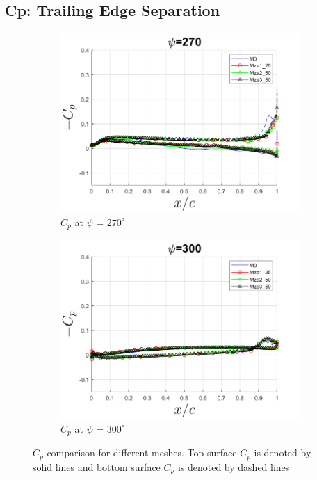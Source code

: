 \subsection{Cp: Trailing Edge Separation}


\begin{figure}
\begin{subfigure}[b]{0.475\textwidth}
\centering
\includegraphics[width=1\textwidth]{figures/zonal_adapt_results/Cp/phase_270.png}
\caption{ $C_p$ at $\psi$ = $270^\circ$}
\label{fig:zonal_Cp_270}
\end{subfigure}
\begin{subfigure}[b]{0.475\textwidth}
\centering
\includegraphics[width=1\textwidth]{figures/zonal_adapt_results/Cp/phase_300.png}
\caption{ $C_p$ at $\psi$ = $300^\circ$}
\label{fig:zonal_Cp_300}
\end{subfigure}
\caption{$C_p$ comparison for different meshes. Top surface $C_p$ is denoted by solid lines and bottom surface $C_p$ is denoted by dashed lines}
\label{fig:zonal_Cp_plots_TEV}
\end{figure}


